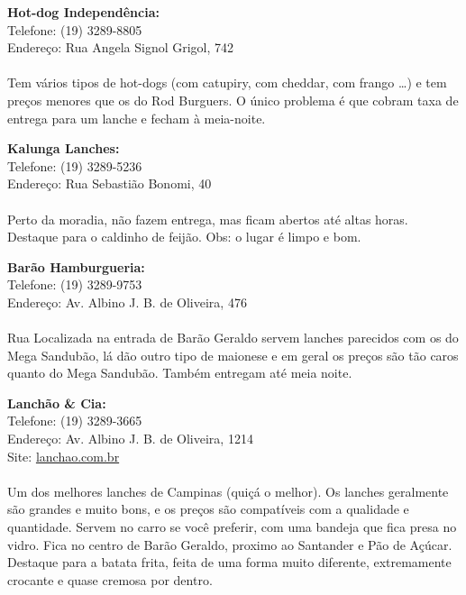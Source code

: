 %
%


    \item   \textbf{Hot-dog Independência:}
        \\Telefone: (19) 3289-8805
        \\Endereço: Rua Angela Signol Grigol, 742
        \\\\
        Tem vários tipos de hot-dogs (com catupiry, com cheddar, com frango
        {\dots}) e tem preços menores que os do Rod Burguers. O único problema
        é que cobram taxa de entrega para um lanche e fecham à meia-noite.

    \item   \textbf{Kalunga Lanches:}
        \\Telefone: (19) 3289-5236
        \\Endereço: Rua Sebastião Bonomi, 40
        \\\\
        Perto da moradia, não fazem entrega, mas ficam abertos até altas horas.
        Destaque para o caldinho de feijão. Obs: o lugar é limpo e bom.

    \item   \textbf{Barão Hamburgueria:}
        \\Telefone: (19) 3289-9753
        \\Endereço: Av. Albino J. B. de Oliveira, 476
        \\\\
        Rua Localizada na entrada de Barão Geraldo servem lanches parecidos com
        os do Mega Sandubão, lá dão outro tipo de maionese e em geral os preços
        são tão caros quanto do Mega Sandubão. Também entregam até meia noite.

    \item   \textbf{Lanchão \& Cia:}
        \\Telefone: (19) 3289-3665
        \\Endereço: Av. Albino J. B. de Oliveira, 1214
        \\Site: \url{lanchao.com.br}
        \\\\
        Um dos melhores lanches de Campinas (quiçá o melhor). Os lanches
        geralmente são grandes e muito bons, e os preços são compatíveis com a
        qualidade e quantidade. Servem no carro se você preferir, com uma
        bandeja que fica presa no vidro. Fica no centro de Barão Geraldo,
        proximo ao Santander e Pão de Açúcar. Destaque para a batata frita,
        feita de uma forma muito diferente, extremamente crocante e quase
        cremosa por dentro.

